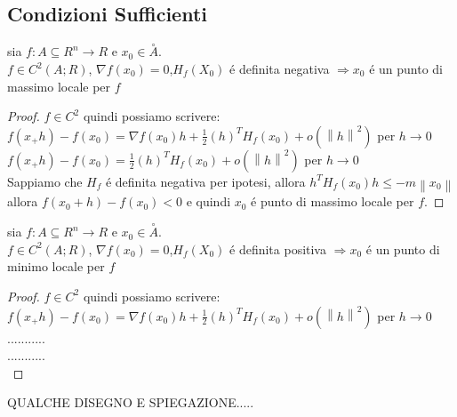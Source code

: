 \subsection{Condizioni Sufficienti}
\proposition
sia $f:A\subseteq R^n\rightarrow R$ e $x_0\in\overset{\circ}{A}$.\\
$f\in C^2(A;R)$, $\nabla f(x_0)=0$,$H_f(X_0)$ \'e definita negativa $\Rightarrow x_0$ \'e un punto di massimo locale per $f$
\begin{proof}
	$f\in C^2$ quindi possiamo scrivere:\\
	$f(x_+h)-f(x_0)=\nabla f(x_0)h+\frac{1}{2}(h)^TH_f(x_0)+o(\left\|h\right\|^2)$ per $h\rightarrow 0$\\
	$f(x_+h)-f(x_0)=\frac{1}{2}(h)^TH_f(x_0)+o(\left\|h\right\|^2)$ per $h\rightarrow 0$\\
	Sappiamo che $H_f$ \'e definita negativa per ipotesi, allora $h^TH_f(x_0)h\le -m\left\|x_0\right\|$ allora $f(x_0+h)-f(x_0)<0$ e quindi $x_0$ \'e punto di massimo locale per $f$.
\end{proof} 
\proposition
sia $f:A\subseteq R^n\rightarrow R$ e $x_0\in\overset{\circ}{A}$.\\
$f\in C^2(A;R)$, $\nabla f(x_0)=0$,$H_f(X_0)$ \'e definita positiva $\Rightarrow x_0$ \'e un punto di minimo locale per $f$
\begin{proof}
	$f\in C^2$ quindi possiamo scrivere:\\
	$f(x_+h)-f(x_0)=\nabla f(x_0)h+\frac{1}{2}(h)^TH_f(x_0)+o(\left\|h\right\|^2)$ per $h\rightarrow 0$\\
	...........\\
	...........\\
\end{proof} 
QUALCHE DISEGNO E SPIEGAZIONE.....
